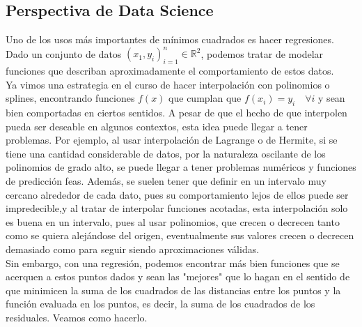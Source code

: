 \documentclass[12pt]{article}
\begin{document}
\begin{center}
    \section{Perspectiva de Data Science}
\end{center}
Uno de los usos más importantes de mínimos cuadrados es hacer regresiones.\\ Dado un conjunto de datos $(x_1,y_i)_{i=1}^n \in \mathds{R}^2$, podemos tratar de modelar funciones que describan aproximadamente el comportamiento de estos datos.\\ Ya vimos una estrategia en el curso de hacer interpolación con polinomios o splines, encontrando funciones $f(x)$ que cumplan que $f(x_i) = y_i \quad \forall i$ y sean bien comportadas en ciertos sentidos. A pesar de que el hecho de que interpolen pueda ser deseable en algunos contextos, esta idea puede llegar  a tener problemas. Por ejemplo, al usar interpolación de Lagrange o de Hermite, si se tiene una cantidad considerable de datos, por la naturaleza oscilante de los polinomios de grado alto, se puede llegar a tener problemas numéricos y funciones de predicción feas. Además, se suelen tener que definir en un intervalo muy cercano alrededor de cada dato, pues su comportamiento lejos de ellos puede ser impredecible,y al tratar de interpolar funciones acotadas, esta interpolación solo es buena en un intervalo, pues al usar polinomios, que crecen o decrecen tanto como se quiera alejándose del origen, eventualmente sus valores crecen o decrecen demasiado como para seguir siendo aproximaciones válidas.\\
Sin embargo, con una regresión, podemos encontrar más bien funciones que se acerquen a estos puntos dados y sean las "mejores" que lo hagan en el sentido de que minimicen la suma de los cuadrados de las distancias entre los puntos y la función evaluada en los puntos, es decir, la suma de los cuadrados de los residuales. Veamos como hacerlo.\\
\end{document}

